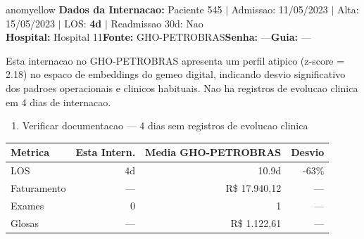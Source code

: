 \documentclass[a4paper,10pt]{article}
\begin{document}
\begin{anomalycard}[Internacao 47723 | GHO-PETROBRAS | MODERADO (z=2.18)]{anomyellow}
\textbf{Dados da Internacao:} Paciente 545 $\mid$ Admissao: 11/05/2023 $\mid$ Alta: 15/05/2023 $\mid$ LOS: \textbf{4d} $\mid$ Readmissao 30d: Nao\\
\textbf{Hospital:} Hospital 11\quad\textbf{Fonte:} GHO-PETROBRAS\quad\textbf{Senha:} ---\quad\textbf{Guia:} ---\\
\vspace{2pt}\begin{tcolorbox}[colback=severityred!20,colframe=anomyellow,title={\textbf{Interpretacao de Negocio}},fonttitle=\bfseries\small,left=4pt,right=4pt,top=3pt,bottom=3pt]
{\small Esta internacao no GHO-PETROBRAS apresenta um perfil atipico (z-score = 2.18) no espaco de embeddings do gemeo digital, indicando desvio significativo dos padroes operacionais e clinicos habituais. Nao ha registros de evolucao clinica em 4 dias de internacao.}
\end{tcolorbox}
\begin{tcolorbox}[colback=severityyellow!30,colframe=anomorange,title={\textbf{Recomendacoes Especificas}},fonttitle=\bfseries\small,left=4pt,right=4pt,top=3pt,bottom=3pt]
\begin{enumerate}[nosep,leftmargin=16pt]
\item {\small Verificar documentacao --- 4 dias sem registros de evolucao clinica}
\end{enumerate}
\end{tcolorbox}
\begin{center}\begin{tabular}{l r r r}\toprule\textbf{Metrica} & \textbf{Esta Intern.} & \textbf{Media GHO-PETROBRAS} & \textbf{Desvio} \\\midrule
LOS & 4d & 10.9d & -63\% \\
Faturamento & --- & R\$ 17.940,12 & --- \\
Exames & 0 & 1 & --- \\
Glosas & --- & R\$ 1.122,61 & --- \\
\bottomrule\end{tabular}\end{center}


\end{anomalycard}
\end{document}
